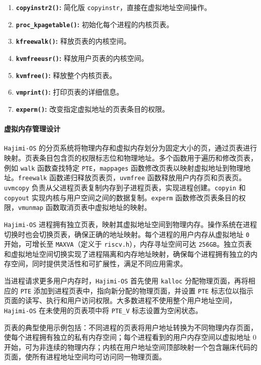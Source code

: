 \documentclass[UTF8]{article}
\begin{document}
\begin{enumerate}[label=\textbf{\arabic*}., wide, labelwidth=!, labelindent=0pt]
  \item \textbf{\texttt{copyinstr2()}:} 简化版 \texttt{copyinstr}，直接在虚拟地址空间操作。
  \item \textbf{\texttt{proc\_kpagetable()}:} 初始化每个进程的内核页表。
  \item \textbf{\texttt{kfreewalk()}:} 释放页表的内核空间。
  \item \textbf{\texttt{kvmfreeusr()}:} 释放用户页表的内核空间。
  \item \textbf{\texttt{kvmfree()}:} 释放整个内核页表。
  \item \textbf{\texttt{vmprint()}:} 打印页表的详细信息。
  \item \textbf{\texttt{experm()}:} 改变指定虚拟地址的页表条目的权限。
\end{enumerate}

\paragraph{虚拟内存管理设计\\}
\texttt{Hajimi-OS} 的分页系统将物理内存和虚拟内存划分为固定大小的页，通过页表进行映射。页表条目包含页的权限标志位和物理地址。多个函数用于遍历和修改页表，例如 \texttt{walk} 函数查找特定 \texttt{PTE}，\texttt{mappages} 函数修改页表以映射虚拟地址到物理地址。\texttt{freewalk} 函数递归释放页表页，\texttt{uvmfree} 函数释放用户内存页和页表页。\texttt{uvmcopy} 负责从父进程页表复制内存到子进程页表，实现进程创建。\texttt{copyin} 和 \texttt{copyout} 实现内核与用户空间之间的数据复制。\texttt{experm} 函数修改页表条目的权限，\texttt{vmunmap} 函数取消页表中虚拟地址的映射。

\texttt{Hajimi-OS} 进程拥有独立页表，映射其虚拟地址空间到物理内存。操作系统在进程切换时也会切换页表，确保正确的地址映射。每个进程的用户内存从虚拟地址 \texttt{0} 开始，可增长至 \texttt{MAXVA}（定义于 \texttt{riscv.h}），内存寻址空间可达 \texttt{256GB}。独立页表和虚拟地址空间切换实现了进程隔离和内存地址映射，确保每个进程拥有独立的内存空间，同时提供灵活性和可扩展性，满足不同应用需求。

当进程请求更多用户内存时，\texttt{Hajimi-OS} 首先使用 \texttt{kalloc} 分配物理页面，再将相应的 \texttt{PTE} 添加到进程页表中，指向新分配的物理页面，并设置 \texttt{PTE} 标志位以指示页面的读写、执行和用户访问权限。大多数进程不使用整个用户地址空间，\texttt{Hajimi-OS} 在未使用的页表项中将 \texttt{PTE\_V} 标志设置为空闲状态。

页表的典型使用示例包括：不同进程的页表将用户地址转换为不同物理内存页面，使每个进程拥有独立的私有内存空间；每个进程看到的用户内存空间以虚拟地址 0 开始，可为非连续的物理内存；内核在用户地址空间顶部映射一个包含蹦床代码的页面，使所有进程地址空间均可访问同一物理页面。
\end{document}
